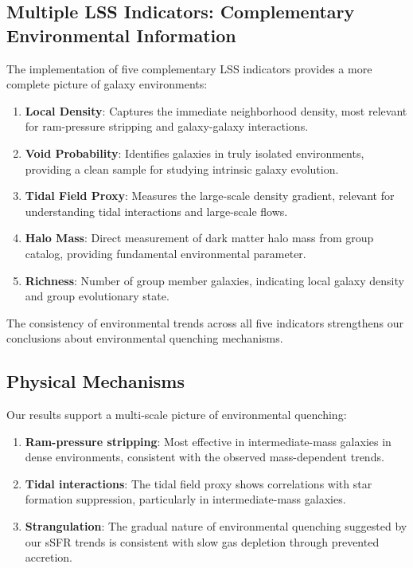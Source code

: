 \documentclass[twocolumn]{aastex701}
\begin{document}
\subsection{Multiple LSS Indicators: Complementary Environmental Information}

The implementation of five complementary LSS indicators provides a more complete picture of galaxy environments:

\begin{enumerate}
\item \textbf{Local Density}: Captures the immediate neighborhood density, most relevant for ram-pressure stripping and galaxy-galaxy interactions.

\item \textbf{Void Probability}: Identifies galaxies in truly isolated environments, providing a clean sample for studying intrinsic galaxy evolution.

\item \textbf{Tidal Field Proxy}: Measures the large-scale density gradient, relevant for understanding tidal interactions and large-scale flows.

\item \textbf{Halo Mass}: Direct measurement of dark matter halo mass from group catalog, providing fundamental environmental parameter.

\item \textbf{Richness}: Number of group member galaxies, indicating local galaxy density and group evolutionary state.
\end{enumerate}

The consistency of environmental trends across all five indicators strengthens our conclusions about environmental quenching mechanisms.

\subsection{Physical Mechanisms}

Our results support a multi-scale picture of environmental quenching:

\begin{enumerate}
\item \textbf{Ram-pressure stripping}: Most effective in intermediate-mass galaxies in dense environments, consistent with the observed mass-dependent trends.

\item \textbf{Tidal interactions}: The tidal field proxy shows correlations with star formation suppression, particularly in intermediate-mass galaxies.

\item \textbf{Strangulation}: The gradual nature of environmental quenching suggested by our sSFR trends is consistent with slow gas depletion through prevented accretion.
\end{enumerate}
\end{document}
